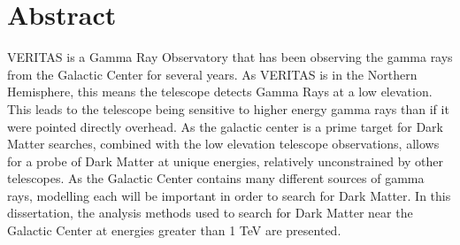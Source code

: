 \cleartooddpage[\thispagestyle{empty}]
\section*{Abstract}

VERITAS is a Gamma Ray Observatory that has been observing the gamma rays from the Galactic Center for several years.
As VERITAS is in the Northern Hemisphere, this means the telescope detects Gamma Rays at a low elevation.
This leads to the telescope being sensitive to higher energy gamma rays than if it were pointed directly overhead.
As the galactic center is a prime target for Dark Matter searches, combined with the low elevation telescope observations, allows for a probe of Dark Matter at unique energies, relatively unconstrained by other telescopes.
As the Galactic Center contains many different sources of gamma rays, modelling each will be important in order to search for Dark Matter.
In this dissertation, the analysis methods used to search for Dark Matter near the Galactic Center at energies greater than 1 TeV are presented.



\cleartoevenpage[\thispagestyle{plain}]
\null
